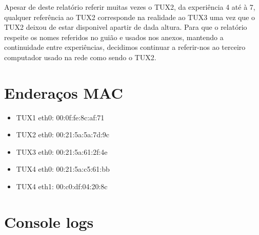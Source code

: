 \documentclass[11pt,a4paper,reqno]{report}
\numberwithin{equation}{section}
\begin{document}
Apesar de deste relatório referir muitas vezes o TUX2, da experiência 4 até à 7, qualquer referência ao TUX2 corresponde na realidade ao TUX3 uma vez que o TUX2 deixou de estar disponivel apartir de dada altura. Para que o relatório respeite os nomes referidos no guião e usados nos anexos, mantendo a continuidade entre experiências, decidimos continuar a referir-nos ao terceiro computador usado na rede como sendo o TUX2.  



\begin{appendices}

\chapter{Enderaços MAC}

\begin{itemize} 
\item TUX1 eth0: 00:0f:fe:8c:af:71
\item TUX2 eth0: 00:21:5a:5a:7d:9c
\item TUX3 eth0: 00:21:5a:61:2f:4e
\item TUX4 eth0: 00:21:5a:c5:61:bb
\item TUX4 eth1: 00:c0:df:04:20:8c
\end{itemize}

\chapter{Console logs}%


\end{appendices}
\end{document}
